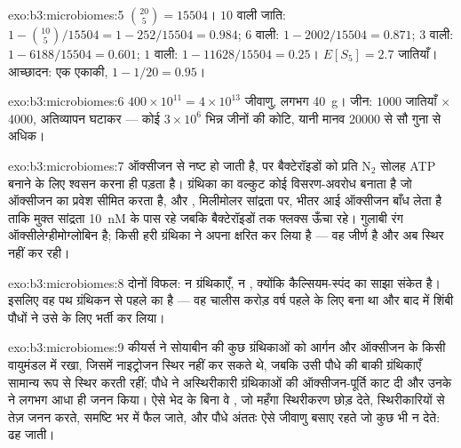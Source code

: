 \begin{solution}{exo:b3:microbiomes:5}
$\binom{20}{5} = \num{15504}$। $10$ वाली जाति: $1 - \binom{10}{5}/
\num{15504} = 1 - 252/\num{15504} = 0.984$; $6$ वाली: $1 - 2002/\num{15504}
= 0.871$; $3$ वाली: $1 - 6188/\num{15504} = 0.601$; $1$ वाली: $1 -
\num{11628}/\num{15504} = 0.25$। $E[S_{5}] = 2.7$ जातियाँ। आच्छादन: एक
एकाकी, $1 - 1/20 = 0.95$।
\end{solution}

\begin{solution}{exo:b3:microbiomes:6}
$400\times 10^{11} = 4\times 10^{13}$ जीवाणु, लगभग \qty{40}{g}। जीन:
$1000$ जातियाँ $\times$ \num{4000}, अतिव्यापन घटाकर --- कोई
$3\times 10^{6}$ भिन्न जीनों की कोटि, यानी मानव \num{20000} से सौ गुना
से अधिक।
\end{solution}

\begin{solution}{exo:b3:microbiomes:7}
 ऑक्सीजन से नष्ट हो जाती है, पर बैक्टेरॉइडों को प्रति
N$_{2}$ सोलह ATP बनाने के लिए श्वसन करना ही पड़ता है। ग्रंथिका का
वल्कुट कोई विसरण-अवरोध बनाता है जो ऑक्सीजन का प्रवेश सीमित करता है, और
, मिलीमोलर सांद्रता पर, भीतर आई ऑक्सीजन बाँध लेता है
ताकि मुक्त सांद्रता \qty{10}{nM} के पास रहे जबकि बैक्टेरॉइडों तक फ्लक्स
ऊँचा रहे। गुलाबी रंग ऑक्सीलेग्हीमोग्लोबिन है; किसी हरी ग्रंथिका ने
अपना  क्षरित कर लिया है --- वह जीर्ण है और अब स्थिर
नहीं कर रही।
\end{solution}

\begin{solution}{exo:b3:microbiomes:8}
दोनों विफल: न ग्रंथिकाएँ, न , क्योंकि कैल्सियम-स्पंद
 का साझा संकेत है। इसलिए वह पथ ग्रंथिकन से पहले का है
--- वह चालीस करोड़ वर्ष पहले  के लिए बना था और बाद में
शिंबी पौधों ने उसे  के लिए भर्ती कर लिया।
\end{solution}

\begin{solution}{exo:b3:microbiomes:9}
कीयर्स ने सोयाबीन की कुछ ग्रंथिकाओं को आर्गन और ऑक्सीजन के किसी
वायुमंडल में रखा, जिसमें  नाइट्रोजन स्थिर नहीं कर सकते थे,
जबकि उसी पौधे की बाकी ग्रंथिकाएँ सामान्य रूप से स्थिर करती रहीं; पौधे
ने अस्थिरीकारी ग्रंथिकाओं की ऑक्सीजन-पूर्ति काट दी और उनके  ने
लगभग आधा ही जनन किया। ऐसे भेद के बिना वे , जो महँगा
स्थिरीकरण छोड़ देते, स्थिरीकारियों से तेज़ जनन करते, समष्टि भर में फैल
जाते, और पौधे अंततः ऐसे जीवाणु बसाए रहते जो कुछ भी न देते: 
ढह जाती।
\end{solution}

